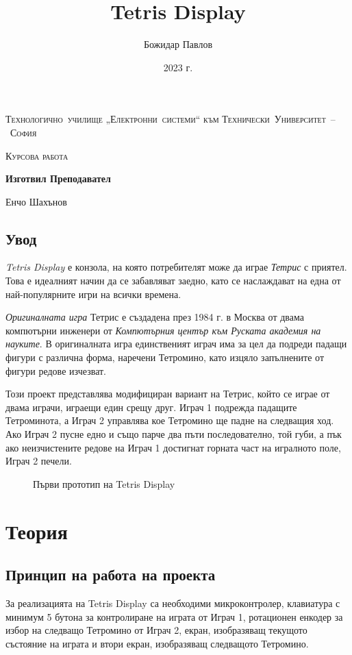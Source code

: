 \documentclass[titlepage, oneside, 14pt]{extbook}
\author{Божидар Павлов}
\title{Tetris Display}
\date{2023 г.}
\renewcommand{\texttt}[1]{{\small\ttfamily #1}}
\renewcommand{\maketitle}
{
    \begin{titlepage}
        \centering
        {\large\scshape Технологично~училище „Електронни~системи“ към Технически~Университет~–~София\par}
        \vfill
        {\LARGE\scshape\mdseries Курсова работа\par}
        \vspace{1cm}
        {\Huge\bfseries\thetitle\par}
        \vfill
        {\large\bfseries Изготвил \hfill Преподавател\par}
        {\Large\theauthor \hfill Енчо Шахънов\par}
        \vspace{1cm}
        {\large\thedate\par}
    \end{titlepage}
}
\begin{document}
\maketitle

\setcounter{page}{2}

\section*{Увод}

\textit{Tetris Display} е конзола, на която потребителят може да играе
\textit{Тетрис} с приятел. Това е идеалният начин да се забавляват заедно, като се
наслаждават на една от най-популярните игри на всички времена.

\textit{Оригиналната игра} Тетрис е създадена през 1984 г. в Москва от двама компютърни инженери от
\textit{Компютърния център към Руската академия на науките}. В оригиналната игра
единственият играч има за цел да подреди падащи фигури с различна форма,
наречени Тетромино, като изцяло запълнените от фигури редове изчезват.

Този проект представлява модифициран вариант на Тетрис, който се играе от двама играчи,
играещи един срещу друг. Играч 1 подрежда падащите Тетроминота, а Играч 2 управлява кое Тетромино
ще падне на следващия ход. Ако Играч 2 пусне
едно и също парче два пъти последователно, той губи, а пък ако неизчистените редове на Играч 1 достигнат горната част на игралното поле, Играч 2 печели.
\vfill

\begin{figure}[!htbp]
    \centering
    \texttt{[image: img/prototype1.png]}
    \caption{Първи прототип на \textmd{Tetris Display}}
\end{figure}

\chapter{Теория}

\section{Принцип на работа на проекта}

За реализацията на \textmd{Tetris Display} са необходими микроконтролер,
клавиатура с минимум 5 бутона за контролиране на играта от Играч 1,
ротационен енкодер за избор на следващо Тетромино от Играч 2, екран, изобразяващ текущото
състояние на играта и втори екран, изобразяващ следващото Тетромино.
\end{document}
